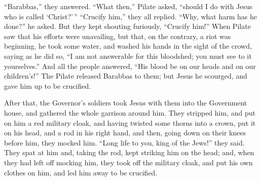 ``Barabbas,'' they answered.  ``What then,'' Pilate asked,
``should I do with Jesus who is called `Christ?'\,'' ``Crucify him,''
they all replied.  ``Why, what harm has he done?'' he
asked. But they kept shouting furiously, ``Crucify him!'' 
When Pilate saw that his efforts were unavailing, but that, on the
contrary, a riot was beginning, he took some water, and washed his hands
in the sight of the crowd, saying as he did so, ``I am not answerable
for this bloodshed; you must see to it yourselves.''  And
all the people answered, ``His blood be on our heads and on our
children's!''  The Pilate released Barabbas to them; but
Jesus he scourged, and gave him up to be crucified.

 After that, the Governor's soldiers took Jesus with them
into the Government house, and gathered the whole garrison around him.
 They stripped him, and put on him a red military cloak,
 and having twisted some thorns into a crown, put it on his
head, and a rod in his right hand, and then, going down on their knees
before him, they mocked him. ``Long life to you, king of the Jews!''
they said.  They spat at him and, taking the rod, kept
striking him on the head;  and, when they had left off
mocking him, they took off the military cloak, and put his own clothes
on him, and led him away to be crucified.

